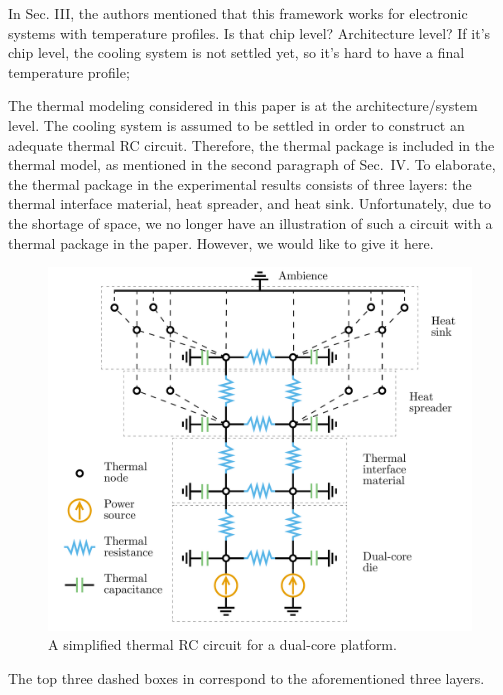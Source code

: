 \begin{reviewer}
In Sec. III, the authors mentioned that this framework works for electronic systems with temperature profiles. Is that chip level? Architecture level? If it’s chip level, the cooling system is not settled yet, so it’s hard to have a final temperature profile;
\end{reviewer}
\begin{authors}
The thermal modeling considered in this paper is at the architecture/system level.
The cooling system is assumed to be settled in order to construct an adequate thermal RC circuit.
Therefore, the thermal package is included in the thermal model, as mentioned in the second paragraph of Sec.~IV.
To elaborate, the thermal package in the experimental results consists of three layers: the thermal interface material, heat spreader, and heat sink.
Unfortunately, due to the shortage of space, we no longer have an illustration of such a circuit with a thermal package in the paper.
However, we would like to give it here.
\begin{figure}[!h]
  \centering
  \includegraphics[width=0.5\linewidth]{include/assets/circuit.pdf}
  \vspace{-0.5em}
  \caption{A simplified thermal RC circuit for a dual-core platform.}
\end{figure}

The top three dashed boxes in  correspond to the aforementioned three layers.

\end{authors}

